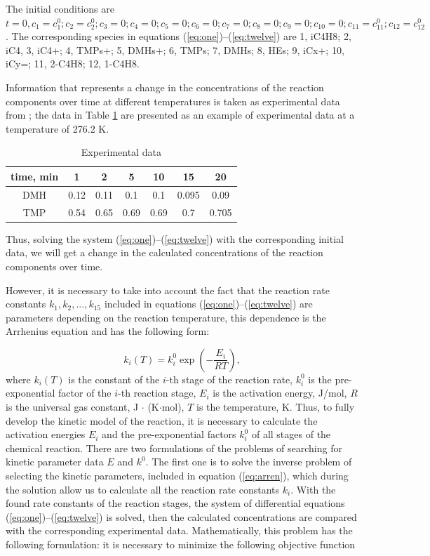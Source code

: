 \documentclass{svproc}
\begin{document}
The initial conditions are $t = 0, c_1 = c_1^0; c_2=c_2^0; c_3 = 0; c_4 = 0; c_5= 0; c_6 = 0; c_7 = 0; c_8 = 0; c_9 = 0; c_{10} = 0; c_{11}=c_{11}^0; c_{12} = c_{12}^0$.
The corresponding species in equations (\ref{eq:one})--(\ref{eq:twelve}) are 1, iC4H8; 2, iC4, 3, iC4+; 4, TMPs+; 5, DMHs+; 6, TMPs; 7, DMHs; 8, HEs; 9, iCx+; 10, iCy=; 11, 2-C4H8; 12, 1-C4H8.

Information that represents a change in the concentrations of the reaction components over time at different temperatures is taken as experimental data from \cite{cao2019}; the data in Table \ref{table1} are presented as an example of experimental data at a temperature of 276.2 K.

\begin{table}
\caption{Experimental data}
\label{table1}
\begin{center}
\begin{tabular}{ccccccc}
\hline
time, min & 1 & 2 & 5 & 10 & 15 & 20 \\
\hline\rule{0pt}{12pt}
DMH & 0.12 & 0.11 & 0.1	& 0.1 &	0.095 &	0.09  \\
TMP & 0.54 & 0.65 & 0.69 & 0.69 & 0.7 & 0.705 \\[2pt]
\hline
\end{tabular}
\end{center}
\end{table}

Thus, solving the system (\ref{eq:one})--(\ref{eq:twelve}) with the corresponding initial data, we will get a change in the calculated concentrations of the reaction components over time.

However, it is necessary to take into account the fact that the reaction rate constants $k_1, k_2, ..., k_{15}$ included in equations (\ref{eq:one})--(\ref{eq:twelve}) are parameters depending on the reaction temperature, this dependence is the Arrhenius equation and has the following form:

\begin{equation}
  k_i (T) = k_i^0 \exp \left(- \dfrac{E_i}{RT} \right),
  \label{eq:arren}
\end{equation}
where $k_i(T)$ is the constant of the $i$-th stage of the reaction rate, $k_i^0$ is the pre-exponential factor of the $i$-th reaction stage, $E_i$ is the activation energy, J/mol, $R$ is the universal gas constant, J $\cdot$ (K$\cdot$mol), $T$ is the temperature, K. Thus, to fully develop the kinetic model of the reaction, it is necessary to calculate the activation energies $E_i$ and the pre-exponential factors $k_i^0$ of all stages of the chemical reaction.  There are two formulations of the problems of searching for kinetic parameter data $E$ and $k^0$. The first one is to solve the inverse problem of selecting the kinetic parameters, included in equation (\ref{eq:arren}), which during the solution allow us to calculate all the reaction rate constants $k_i$. With the found rate constants of the reaction stages, the system of differential equations (\ref{eq:one})--(\ref{eq:twelve}) is solved, then the calculated concentrations are compared with the corresponding experimental data. Mathematically, this problem has the following formulation: it is necessary to minimize the following objective function
\end{document}
